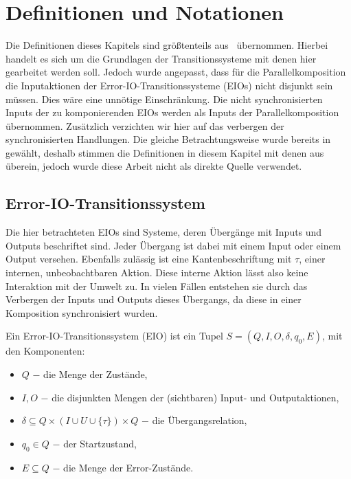 \chapter{Definitionen und Notationen}

Die Definitionen dieses Kapitels sind größtenteils aus~\cite{Vogler2014EIO}
übernommen. Hierbei handelt es sich um die Grundlagen der Transitionssysteme mit denen
hier gearbeitet werden soll. Jedoch wurde angepasst, dass für die
Parallelkomposition die Inputaktionen der Error-IO-Transitionssysteme (EIOs) nicht disjunkt sein müssen. Dies
wäre eine unnötige Einschränkung. Die nicht synchronisierten Inputs der zu komponierenden EIOs werden
als Inputs der Parallelkomposition übernommen. Zusätzlich verzichten wir hier
auf das verbergen der synchronisierten Handlungen. Die gleiche
Betrachtungsweise wurde bereits in~\cite{Schlosser2012BA} gewählt, deshalb
stimmen die Definitionen in diesem Kapitel mit denen aus~\cite{Schlosser2012BA}
überein, jedoch wurde diese Arbeit
nicht als direkte Quelle verwendet.

\section{Error-IO-Transitionssystem}
Die hier betrachteten EIOs sind Systeme, deren Übergänge mit Inputs und Outputs
beschriftet sind. Jeder Übergang ist dabei mit einem Input oder einem Output
versehen. Ebenfalls zulässig ist eine Kantenbeschriftung mit $\tau$, einer
internen, unbeobachtbaren Aktion. Diese interne
Aktion lässt also keine Interaktion mit
der Umwelt zu. In vielen Fällen entstehen sie durch das Verbergen der Inputs und Outputs
dieses Übergangs, da diese in einer Komposition synchronisiert
wurden.

\begin{Def}
  Ein Error-IO-Transitionssystem \linebreak (EIO) ist
  ein Tupel $S=(Q,I,O,\delta, q_0, E)$, mit den Komponenten:
  \begin{itemize}
    \item $Q$ $-$ die Menge der Zustände,
    \item $I,O$ $-$ die disjunkten Mengen der (sichtbaren) Input- und
      Outputaktionen,
    \item $\delta\subseteq Q\times (I\cup U\cup\{\tau\})\times Q$ $-$ die
      Übergangsrelation,
    \item $q_0\in Q$ $-$ der Startzustand,
    \item $E\subseteq Q$ $-$ die Menge der Error-Zustände.
  \end{itemize}
\end{Def}

